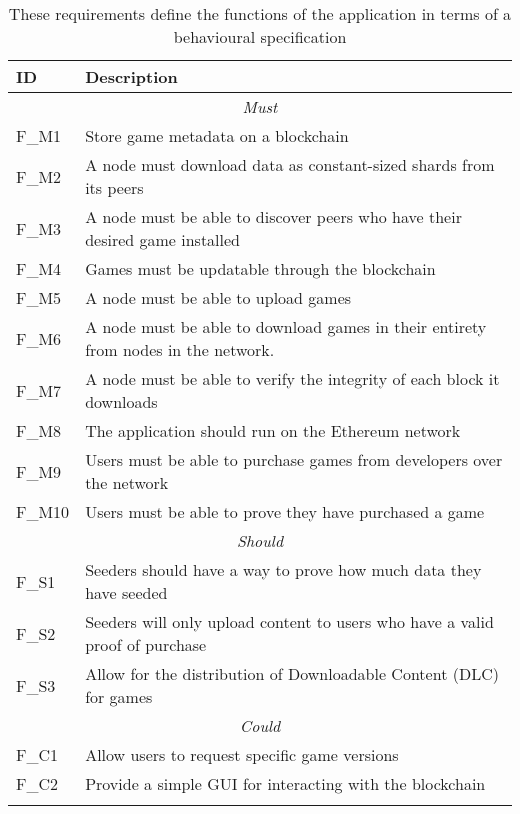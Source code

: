 \begin{longtable}{ p{} p{} }
  \toprule
  \textbf{ID} & \textbf{Description}
  \\\midrule\midrule
  \multicolumn{2}{c}{\cellcolor{red!70}\textit{Must}}                                              \\\midrule
  F\_M1       & Store game metadata on a blockchain                                                \\
  F\_M2       & A node must download data as constant-sized shards from its peers                  \\
  F\_M3       & A node must be able to discover peers who have their desired game installed        \\
  F\_M4       & Games must be updatable through the blockchain                                     \\
  F\_M5       & A node must be able to upload games                                                \\
  F\_M6       & A node must be able to download games in their entirety from nodes in the network. \\
  F\_M7       & A node must be able to verify the integrity of each block it downloads             \\
  F\_M8       & The application should run on the Ethereum network                                 \\
  F\_M9       & Users must be able to purchase games from developers over the network              \\
  F\_M10      & Users must be able to prove they have purchased a game                             \\
  \midrule\multicolumn{2}{c}{\cellcolor{orange!70}\textit{Should}}                                 \\\midrule
  F\_S1       & Seeders should have a way to prove how much data they have seeded                  \\
  F\_S2       & Seeders will only upload content to users who have a valid proof of purchase       \\
  F\_S3       & Allow for the distribution of Downloadable Content (DLC) for games                 \\
  \midrule\multicolumn{2}{c}{\cellcolor{green}\textit{Could}}                                      \\\midrule
  F\_C1       & Allow users to request specific game versions                                      \\
  F\_C2       & Provide a simple GUI for interacting with the blockchain                           \\
  \midrule
  \bottomrule
  \caption{These requirements define the functions of the application in terms of a behavioural specification }
  \label{tab:functional-requirements}
\end{longtable}

